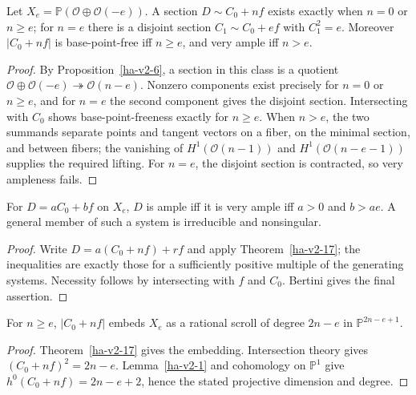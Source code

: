 \begin{theorem}
\label{ha-v2-17}
Let \(X_e=\mathbb P(\mathcal O\oplus\mathcal O(-e))\).  A section
\(D\sim C_0+nf\) exists exactly when \(n=0\) or \(n\ge e\); for \(n=e\) there
is a disjoint section \(C_1\sim C_0+ef\) with \(C_1^2=e\).  Moreover
\(|C_0+nf|\) is base-point-free iff \(n\ge e\), and very ample iff \(n>e\).
\end{theorem}
\begin{proof}
By Proposition~\ref{ha-v2-6}, a section in this class is a quotient
\(\mathcal O\oplus\mathcal O(-e)\twoheadrightarrow\mathcal O(n-e)\).
Nonzero components exist precisely for \(n=0\) or \(n\ge e\), and for \(n=e\)
the second component gives the disjoint section.  Intersecting with \(C_0\)
shows base-point-freeness exactly for \(n\ge e\).  When \(n>e\), the two
summands separate points and tangent vectors on a fiber, on the minimal section,
and between fibers; the vanishing of
\(H^1(\mathcal O(n-1))\) and \(H^1(\mathcal O(n-e-1))\) supplies the required
lifting.  For \(n=e\), the disjoint section is contracted, so very ampleness fails.
\end{proof}

\begin{corollary}
\label{ha-v2-18}
For \(D=aC_0+bf\) on \(X_e\), \(D\) is ample iff it is very ample iff
\(a>0\) and \(b>ae\).  A general member of such a system is irreducible and
nonsingular.
\end{corollary}
\begin{proof}
Write \(D=a(C_0+nf)+r f\) and apply Theorem~\ref{ha-v2-17}; the inequalities
are exactly those for a sufficiently positive multiple of the generating
systems.  Necessity follows by intersecting with \(f\) and \(C_0\).  Bertini
gives the final assertion.
\end{proof}

\begin{corollary}
\label{ha-v2-19}
For \(n\ge e\), \(|C_0+nf|\) embeds \(X_e\) as a rational scroll of degree
\(2n-e\) in \(\mathbb P^{2n-e+1}\).
\end{corollary}
\begin{proof}
Theorem~\ref{ha-v2-17} gives the embedding.  Intersection theory gives
\((C_0+nf)^2=2n-e\).  Lemma~\ref{ha-v2-1} and cohomology on \(\mathbb P^1\) give
\(h^0(C_0+nf)=2n-e+2\), hence the stated projective dimension and degree.
\end{proof}


